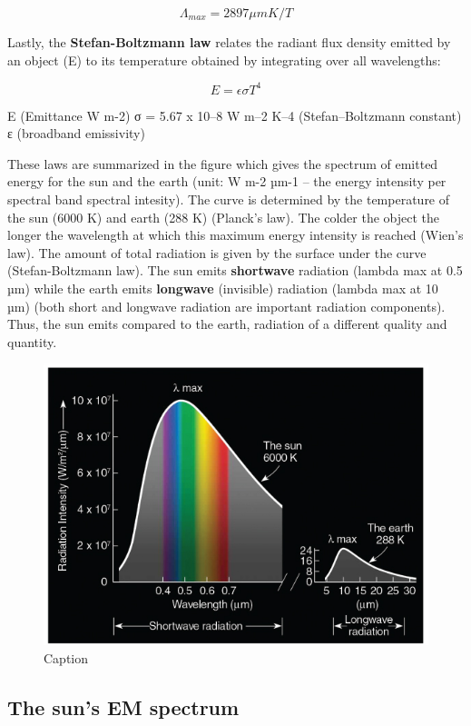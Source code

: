 \documentclass[oneside]{book}
\begin{document}
\begin{equation} 
  \Lambda_{max} = 2897 \mu m K / T 
  \label{eq:Eq3}
\end{equation}

Lastly, the \textbf{Stefan-Boltzmann law} relates the radiant flux
density emitted by an object (E) to its temperature obtained by
integrating over all wavelengths:

\begin{equation} 
  E = \epsilon \sigma T^4
  \label{eq:Eq4}
\end{equation}

E (Emittance W m-2) σ = 5.67 x 10--8 W m--2 K--4 (Stefan--Boltzmann
constant) ε (broadband emissivity)

These laws are summarized in the figure which gives the spectrum of
emitted energy for the sun and the earth (unit: W m-2 µm-1 -- the energy
intensity per spectral band spectral intesity). The curve is determined
by the temperature of the sun (6000 K) and earth (288 K) (Planck's law).
The colder the object the longer the wavelength at which this maximum
energy intensity is reached (Wien's law). The amount of total radiation
is given by the surface under the curve (Stefan-Boltzmann law). The sun
emits \textbf{shortwave} radiation (lambda max at 0.5 µm) while the
earth emits \textbf{longwave} (invisible) radiation (lambda max at 10
µm) (both short and longwave radiation are important radiation
components). Thus, the sun emits compared to the earth, radiation of a
different quality and quantity.

\begin{figure}

{\centering \includegraphics[width=0.5\linewidth]{figures/Figure121} 

}

\caption{Caption}\label{fig:Laws}
\end{figure}

\subsection{The sun's EM spectrum}\label{the-suns-em-spectrum}
\end{document}
